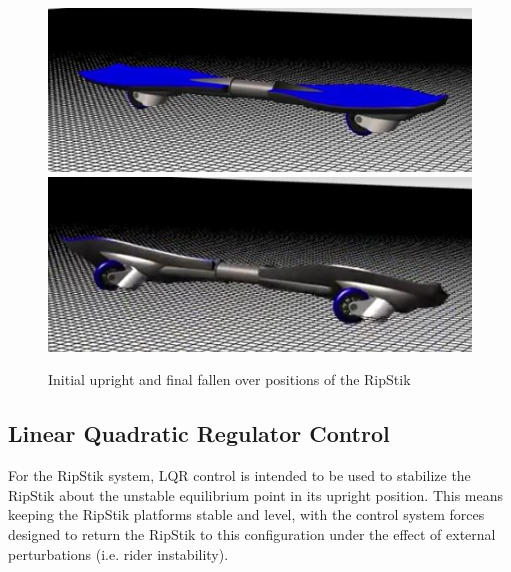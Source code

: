 \begin{figure}[!htb]
	\centering
	\includegraphics[width=\linewidth]{rest}
	\endminipage\hspace{1em}%
	\includegraphics[width=\linewidth]{fall}
	\endminipage
	\caption{Initial upright and final fallen over positions of the RipStik}\label{fig:fallcaster}	
\end{figure}

\subsection{Linear Quadratic Regulator Control}
For the RipStik system, LQR control is intended to be used to stabilize the RipStik about the unstable equilibrium point in its upright position. 
This means keeping the RipStik platforms stable and level, with the control system forces designed to return the RipStik to this configuration under the effect of external perturbations (i.e. rider instability).

